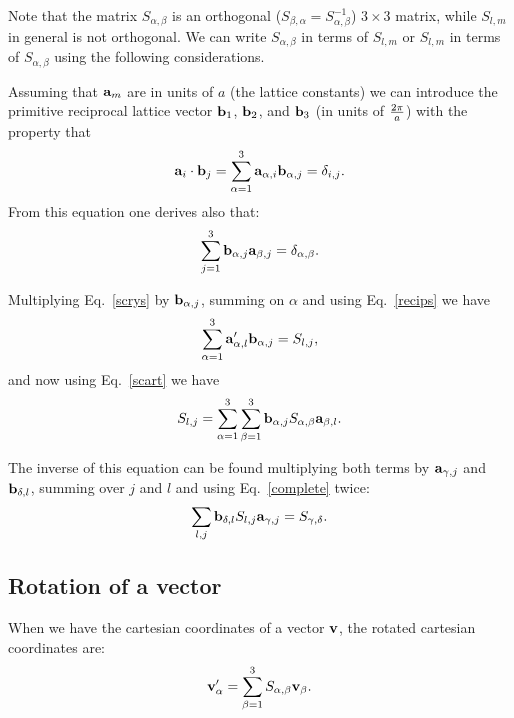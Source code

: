 \documentclass[12pt,a4paper,twoside]{report}
\begin{document}
Note that the matrix $S_{\alpha,\beta}$ is an orthogonal ($S_{\beta,\alpha}=S^{-1}_{\alpha,\beta} $) $3\times 3$ matrix, while 
$S_{l,m}$ in general is not orthogonal. We
can write $S_{\alpha,\beta}$ in terms of $S_{l,m}$ or $S_{l,m}$ in terms
of $S_{\alpha,\beta}$ using the following considerations.

Assuming that ${\bf a}_m$ are in units of $a$ (the lattice constants) we
can introduce the primitive reciprocal lattice vector ${\bf b}_1$, ${\bf b}_2$,
and ${\bf b}_3$ (in units of $2\pi \over a$) with the property that
\begin{equation}
{\bf a}_i \cdot {\bf b}_j = \sum_{\alpha=1}^3 {\bf a}_{\alpha,i} {\bf b}_{\alpha, j} =  \delta_{i,j}.
\label{recips}
\end{equation}
From this equation one derives also that:
\begin{equation}
\sum_{j=1}^3 {\bf b}_{\alpha, j} {\bf a}_{\beta, j} =  \delta_{\alpha,\beta}.
\label{complete}
\end{equation}
 
Multiplying Eq.~\ref{scrys} by ${\bf b}_{\alpha, j}$, summing on $\alpha$ and
using Eq.~\ref{recips} we have
\begin{equation}
\sum_{\alpha=1}^3 {\bf a}'_{\alpha,l} {\bf b}_{\alpha, j} = S_{l,j},
\end{equation}
and now using Eq.~\ref{scart} we have
\begin{equation}
S_{l,j} =\sum_{\alpha=1}^3 \sum_{\beta=1}^3 {\bf b}_{\alpha, j} S_{\alpha,\beta} {\bf a}_{\beta,l}.
\label{slj}
\end{equation}

The inverse of this equation can be found multiplying both terms by
${\bf a}_{\gamma,j}$ and ${\bf b}_{\delta,l}$, summing over $j$ and $l$ and
using Eq.~\ref{complete} twice:
\begin{equation}
\sum_{l,j} {\bf b}_{\delta,l} S_{l,j} {\bf a}_{\gamma,j} = S_{\gamma,\delta}.
\end{equation}

\subsection{Rotation of a vector}
When we have the cartesian coordinates of a vector
${\bf v}$, the rotated cartesian coordinates are:
\begin{equation}
{\bf v}'_\alpha = \sum_{\beta=1}^3 S_{\alpha,\beta} {\bf v}_\beta.
\end{equation}
\end{document}
